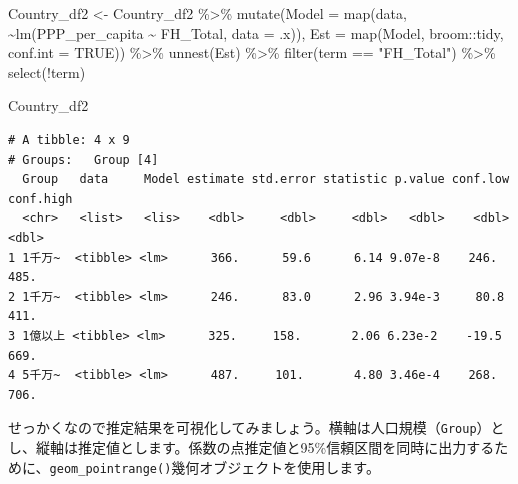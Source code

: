 \documentclass[
  a4paper,
  pandoc,
  ja=standard,
  jafont=haranoaji]{bxjsbook}
\newenvironment{Shaded}{\begin{snugshade}}{\end{snugshade}}
\newcommand{\AttributeTok}[1]{\textcolor[rgb]{0.00,0.48,0.65}{#1}}
\newcommand{\ConstantTok}[1]{\textcolor[rgb]{0.56,0.35,0.01}{#1}}
\newcommand{\FunctionTok}[1]{\textcolor[rgb]{0.28,0.35,0.67}{#1}}
\newcommand{\NormalTok}[1]{\textcolor[rgb]{0.00,0.48,0.65}{#1}}
\newcommand{\OtherTok}[1]{\textcolor[rgb]{0.00,0.48,0.65}{#1}}
\newcommand{\SpecialCharTok}[1]{\textcolor[rgb]{0.37,0.37,0.37}{#1}}
\newcommand{\StringTok}[1]{\textcolor[rgb]{0.13,0.47,0.30}{#1}}
\begin{document}
\begin{Shaded}
\begin{Highlighting}[numbers=left,,]
\NormalTok{Country\_df2 }\OtherTok{\textless{}{-}}\NormalTok{ Country\_df2 }\SpecialCharTok{\%\textgreater{}\%}
  \FunctionTok{mutate}\NormalTok{(}\AttributeTok{Model =} \FunctionTok{map}\NormalTok{(data, }\SpecialCharTok{\textasciitilde{}}\FunctionTok{lm}\NormalTok{(PPP\_per\_capita }\SpecialCharTok{\textasciitilde{}}\NormalTok{ FH\_Total, }\AttributeTok{data =}\NormalTok{ .x)),}
         \AttributeTok{Est   =} \FunctionTok{map}\NormalTok{(Model, broom}\SpecialCharTok{::}\NormalTok{tidy, }\AttributeTok{conf.int =} \ConstantTok{TRUE}\NormalTok{)) }\SpecialCharTok{\%\textgreater{}\%}
  \FunctionTok{unnest}\NormalTok{(Est) }\SpecialCharTok{\%\textgreater{}\%}
  \FunctionTok{filter}\NormalTok{(term }\SpecialCharTok{==} \StringTok{"FH\_Total"}\NormalTok{) }\SpecialCharTok{\%\textgreater{}\%}
  \FunctionTok{select}\NormalTok{(}\SpecialCharTok{!}\NormalTok{term)}

\NormalTok{Country\_df2}
\end{Highlighting}
\end{Shaded}

\begin{verbatim}
# A tibble: 4 x 9
# Groups:   Group [4]
  Group   data     Model estimate std.error statistic p.value conf.low conf.high
  <chr>   <list>   <lis>    <dbl>     <dbl>     <dbl>   <dbl>    <dbl>     <dbl>
1 1千万~  <tibble> <lm>      366.      59.6      6.14 9.07e-8    246.       485.
2 1千万~  <tibble> <lm>      246.      83.0      2.96 3.94e-3     80.8      411.
3 1億以上 <tibble> <lm>      325.     158.       2.06 6.23e-2    -19.5      669.
4 5千万~  <tibble> <lm>      487.     101.       4.80 3.46e-4    268.       706.
\end{verbatim}

せっかくなので推定結果を可視化してみましょう。横軸は人口規模（\texttt{Group}）とし、縦軸は推定値とします。係数の点推定値と95\%信頼区間を同時に出力するために、\texttt{geom\_pointrange()}幾何オブジェクトを使用します。
\end{document}
